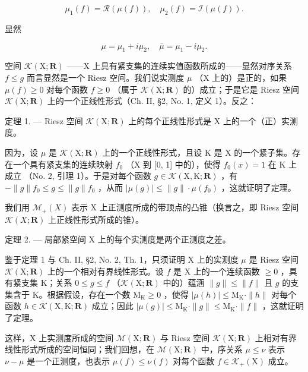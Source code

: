 \[
\mu_ {1} (f) = \mathcal {R} (\mu (f)), \quad \mu_ {2} (f) = \mathcal {I} (\mu (f)).
\]

显然

\[
\mu = \mu_ {1} + i \mu_ {2}, \quad \overline {{{{\mu}}}} = \mu_ {1} - i \mu_ {2}.
\]

空间 \(\mathcal{K}(\mathrm{X};\mathbf{R})\) ——\(\mathrm{X}\) 上具有紧支集的连续实值函数所成的——显然对序关系 \(f\leqslant g\) 而言显然是一个 Riesz 空间。我们说实测度 \(\mu\) （\(\mathrm{X}\) 上的）是正的，如果 \(\mu (f)\geqslant 0\) 对每个函数 \(f\geqslant 0\) （属于 \(\mathcal{K}(\mathrm{X};\mathbf{R})\) 的）成立；于是它是 Riesz 空间 \(\mathcal{K}(\mathrm{X};\mathbf{R})\) 上的一个正线性形式（Ch. II, §2, No. 1, 定义 1）。反之：

定理 1. --- Riesz 空间 \(\mathcal{K}(\mathrm{X};\mathbf{R})\) 上的每个正线性形式是 \(\mathrm{X}\) 上的一个（正）实测度。

因为，设 \(\mu\) 是 \(\mathcal{K}(\mathrm{X};\mathbf{R})\) 上的一个正线性形式，且设 \(\mathrm{K}\) 是 \(\mathrm{X}\) 的一个紧子集。存在一个具有紧支集的连续映射 \(f_0\) （\(\mathrm{X}\) 到 {[}0, 1{]} 中的），使得 \(f_0(x) = 1\) 在 \(\mathrm{K}\) 上成立 （No. 2, 引理 1）。于是对每个函数 \(g \in \mathcal{K}(\mathrm{X},\mathrm{K};\mathbf{R})\) ，有 \(-\| g \| f_0 \leqslant g \leqslant \| g \| f_0\) ，从而 \(|\mu(g)| \leqslant \| g \| \cdot \mu(f_0)\) ，这就证明了定理。

我们用 \(\mathcal{M}_{+}(X)\) 表示 X 上正测度所成的带顶点的凸锥（换言之，即 Riesz 空间 \(\mathcal{K}(X;\mathbf{R})\) 上正线性形式所成的锥）。

定理 2. --- 局部紧空间 X 上的每个实测度是两个正测度之差。

鉴于定理 1 与 Ch. II, §2, No. 2, Th. 1，只须证明 X 上的实测度 \(\mu\) 是 Riesz 空间 \(\mathcal{K}(\mathrm{X};\mathbf{R})\) 上的一个相对有界线性形式。设 \(f\) 是 X 上的一个连续函数 \(\geqslant 0\) ，具有紧支集 K；关系 \(0 \leqslant g \leqslant f\) （\(\mathcal{K}(\mathrm{X};\mathbf{R})\) 中的）蕴涵 \(\|g\| \leqslant \|f\|\) 且 \(g\) 的支集含于 K。根据假设，存在一个数 \(\mathrm{M}_{\mathrm{K}} \geqslant 0\) ，使得 \(|\mu(h)| \leqslant \mathrm{M}_{\mathrm{K}} \cdot \|h\|\) 对每个函数 \(h \in \mathcal{K}(\mathrm{X},\mathrm{K};\mathbf{R})\) 成立；因此 \(|\mu(g)| \leqslant \mathrm{M}_{\mathrm{K}} \cdot \|g\| \leqslant \mathrm{M}_{\mathrm{K}} \cdot \|f\|\) ，这就证明了定理。

这样，X 上实测度所成的空间 \(\mathcal{M}(\mathrm{X};\mathbf{R})\) 与 Riesz 空间 \(\mathcal{K}(\mathrm{X};\mathbf{R})\) 上相对有界线性形式所成的空间恒同；我们回想，在 \(\mathcal{M}(\mathrm{X};\mathbf{R})\) 中，序关系 \(\mu\leqslant\nu\) 表示 \(\nu-\mu\) 是一个正测度，也表示 \(\mu(f)\leqslant\nu(f)\) 对每个函数 \(f\in\mathcal{K}_{+}(\mathrm{X})\) 成立。

